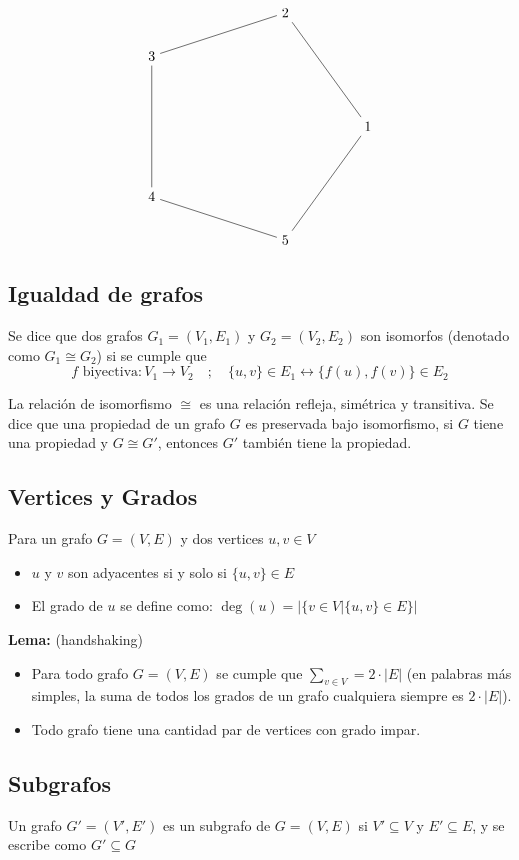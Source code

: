 \documentclass[../main.tex]{subfiles}
\begin{document}
\[
    \begin{tikzpicture}
        \def \n {5}
        \def \radius {3cm}
        \def \margin {8} %

        \foreach \s in {1,...,\n}{
            \node (\s) at ({360/\n * (\s - 1)}:\radius) {$\s$};
        }
        \draw (1) -- (2);
        \draw (2) -- (3);
        \draw (3) -- (4);
        \draw (4) -- (5);
        \draw (5) -- (1);
    \end{tikzpicture}
\]

\subsection{Igualdad de grafos}
Se dice que dos grafos $G_1 = (V_1, E_1)$ y $G_2 = (V_2, E_2)$ son isomorfos (denotado como $G_1 \cong G_2$) si se cumple que
\[ f \text{ biyectiva}: V_1 \rightarrow V_2 \quad ; \quad \{u,v\} \in E_1 \leftrightarrow \{f(u), f(v)\} \in E_2 \]

La relación de isomorfismo $\cong$ es una relación refleja, simétrica y transitiva. Se dice que una propiedad de un grafo $G$ es preservada bajo isomorfismo, si $G$ tiene una propiedad y $G \cong G'$, entonces $G'$ también tiene la propiedad.

\subsection{Vertices y Grados}
Para un grafo $G = (V,E)$ y dos vertices $u,v \in V$
\begin{itemize}
    \item $u$ y $v$ son adyacentes si y solo si $\{u,v\} \in E$
    \item El grado de $u$ se define como: $\deg(u) = |\{ v \in V | \{u,v\} \in E \}|$
\end{itemize}

\textbf{Lema:} (handshaking)
\begin{itemize}
    \item Para todo grafo $G = (V,E)$ se cumple que $\sum_{v \in V} = 2 \cdot |E|$ (en palabras más simples, la suma de todos los grados de un grafo cualquiera siempre es $2 \cdot |E|$).
    \item Todo grafo tiene una cantidad par de vertices con grado impar.
\end{itemize}

\subsection{Subgrafos}
Un grafo $G' = (V',E')$ es un subgrafo de $G = (V,E)$ si $V' \subseteq V$ y $E' \subseteq E$, y se escribe como $G' \subseteq G$
\end{document}
